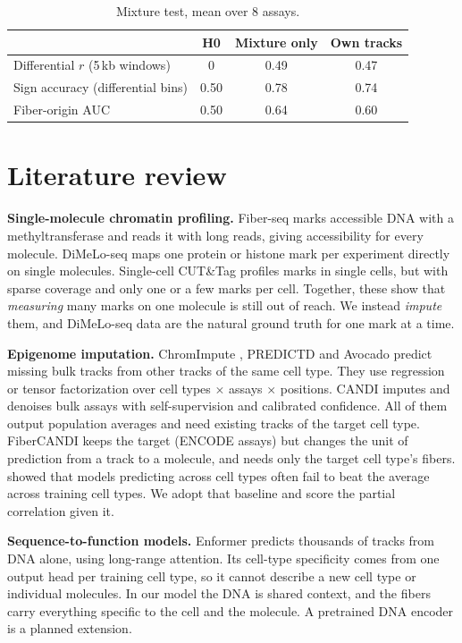 \documentclass[acmtog]{acmart}
\begin{document}
\begin{table}[h]
\caption{Mixture test, mean over 8 assays.}
\label{tab:t3}
\small
\begin{tabular}{lccc}
\toprule
 & H0 & Mixture only & Own tracks \\
\midrule
Differential $r$ (5\,kb windows) & 0 & 0.49 & 0.47 \\
Sign accuracy (differential bins) & 0.50 & 0.78 & 0.74 \\
Fiber-origin AUC & 0.50 & 0.64 & 0.60 \\
\bottomrule
\end{tabular}
\end{table}

\section{Literature review}

\textbf{Single-molecule chromatin profiling.} Fiber-seq \citep{Stergachis20} marks accessible DNA with a methyltransferase and reads it with long reads, giving accessibility for every molecule. DiMeLo-seq \citep{Altemose22} maps one protein or histone mark per experiment directly on single molecules. Single-cell CUT\&Tag \citep{Bartosovic21} profiles marks in single cells, but with sparse coverage and only one or a few marks per cell. Together, these show that \emph{measuring} many marks on one molecule is still out of reach. We instead \emph{impute} them, and DiMeLo-seq data are the natural ground truth for one mark at a time.

\textbf{Epigenome imputation.} ChromImpute \citep{Ernst15}, PREDICTD \citep{Durham18} and Avocado \citep{Schreiber20Avocado} predict missing bulk tracks from other tracks of the same cell type. They use regression or tensor factorization over cell types $\times$ assays $\times$ positions. CANDI \citep{Foroozandeh25} imputes and denoises bulk assays with self-supervision and calibrated confidence. All of them output population averages and need existing tracks of the target cell type. FiberCANDI keeps the target (ENCODE assays) but changes the unit of prediction from a track to a molecule, and needs only the target cell type's fibers. \citet{Schreiber20Pitfall} showed that models predicting across cell types often fail to beat the average across training cell types. We adopt that baseline and score the partial correlation given it.

\textbf{Sequence-to-function models.} Enformer \citep{Avsec21} predicts thousands of tracks from DNA alone, using long-range attention. Its cell-type specificity comes from one output head per training cell type, so it cannot describe a new cell type or individual molecules. In our model the DNA is shared context, and the fibers carry everything specific to the cell and the molecule. A pretrained DNA encoder is a planned extension.
\end{document}
